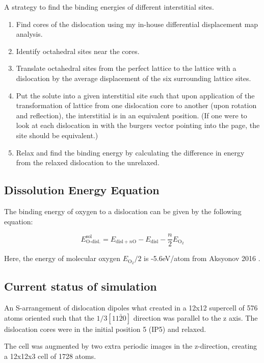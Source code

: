 \documentclass[11pt]{article}
\begin{document}
A strategy to find the binding energies of different interstitial
sites. 

\begin{enumerate}
\item Find cores of the dislocation using my in-house differential
displacement map analysis.
\item Identify octahedral sites near the cores.
\item Translate octahedral sites from the perfect lattice to the
lattice with a dislocation by the average displacement of the six
surrounding lattice sites.
\item Put the solute into a given interstitial site such that upon
application of the transformation of lattice from one
dislocation core to another (upon rotation and reflection), the
interstitial is in an equivalent position. (If one were to look
at each dislocation in with the burgers vector pointing into the
page, the site should be equivalent.)
\item Relax and find the binding energy by calculating the difference
in energy from the relaxed dislocation to the unrelaxed.
\end{enumerate}


\subsection{Dissolution Energy Equation}
\label{sec:org80e55c0}

The binding energy of oxygen to a dislocation can be given by the
following equation:

\[ E^{\text{sol}}_{\text{O-disl.}} = E_{\text{disl} + n\text{O}} -
   E_{\text{disl}} - \frac{n}{2} E_{\text{O}_2}   \]

Here, the energy of molecular oxygen \(E_{\text{O}_2}/2\) is -5.6eV/atom
from Aksyonov 2016 \cite{Aksyonov2016}. 



\subsection{Current status of simulation}
\label{sec:org8be369a}

An S-arrangement of dislocation dipoles what created in a 12x12
supercell of 576 atoms oriented such that the \(1/3[11\bar{2}0]\)
direction was parallel to the z axis. The dislocation cores were in
the initial position 5 (IP5) and relaxed.

The cell was augmented by two extra periodic images in the
z-direction, creating a 12x12x3 cell of 1728 atoms. 
\end{document}
